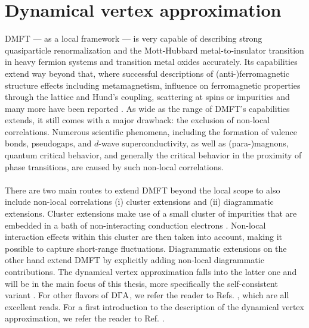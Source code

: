\documentclass[../../main.tex]{subfiles}
\begin{document}
\section{Dynamical vertex approximation}\label{sec:dga}

DMFT --- as a local framework --- is very capable of describing strong quasiparticle renormalization and the Mott-Hubbard metal-to-insulator transition in heavy fermion systems and transition metal oxides accurately. Its capabilities extend way beyond that, where successful descriptions of (anti-)ferromagnetic structure effects including metamagnetism, influence on ferromagnetic properties through the lattice and Hund's coupling, scattering at spins or impurities and many more have been reported \cite{Held2007, Kotliar2006}. As wide as the range of DMFT's capabilities extends, it still comes with a major drawback: the exclusion of non-local correlations. Numerous scientific phenomena, including the formation of valence bonds, pseudogaps, and $d$-wave superconductivity, as well as (para-)magnons, quantum critical behavior, and generally the critical behavior in the proximity of phase transitions, are caused by such non-local correlations.
\\\\
There are two main routes to extend DMFT beyond the local scope to also include non-local correlations \cite{Rohringer2012} (i) cluster extensions and (ii) diagrammatic extensions. Cluster extensions make use of a small cluster of impurities that are embedded in a bath of non-interacting conduction electrons \cite{Slezak2009}. Non-local interaction effects within this cluster are then taken into account, making it possible to capture short-range fluctuations. Diagrammatic extensions on the other hand extend DMFT by explicitly adding non-local diagrammatic contributions. The dynamical vertex approximation falls into the latter one and will be in the main focus of this thesis, more specifically the self-consistent  variant \cite{Kaufmann2021}. For other flavors of $\text{D}\Gamma\text{A}$, we refer the reader to Refs. \cite{DelRe2021, Valli2015, Schafer2021, Katanin2009, Held2008, Stobbe2022, Augustinsky2011, Tam2013}, which are all excellent reads. For a first introduction to the  description of the dynamical vertex approximation, we refer the reader to Ref. \cite{Toschi2007}. 
\\\\
\end{document}

